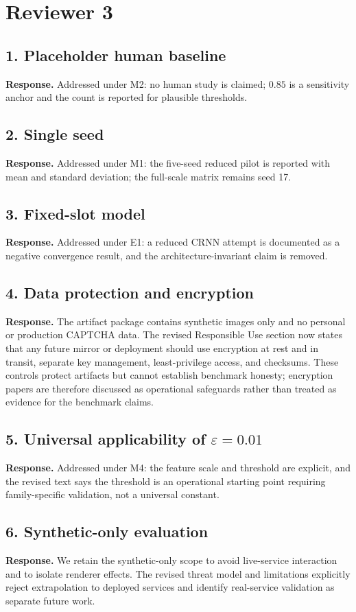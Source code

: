 \documentclass[11pt]{article}
\newcommand{\response}[1]{\par\noindent\textbf{Response.} #1\par}
\begin{document}
\section*{Reviewer 3}
\subsection*{1. Placeholder human baseline}
\response{Addressed under M2: no human study is claimed; $0.85$ is a sensitivity anchor and the count is reported for plausible thresholds.}
\subsection*{2. Single seed}
\response{Addressed under M1: the five-seed reduced pilot is reported with mean and standard deviation; the full-scale matrix remains seed 17.}
\subsection*{3. Fixed-slot model}
\response{Addressed under E1: a reduced CRNN attempt is documented as a negative convergence result, and the architecture-invariant claim is removed.}
\subsection*{4. Data protection and encryption}
\response{The artifact package contains synthetic images only and no personal or production CAPTCHA data. The revised Responsible Use section now states that any future mirror or deployment should use encryption at rest and in transit, separate key management, least-privilege access, and checksums. These controls protect artifacts but cannot establish benchmark honesty; encryption papers are therefore discussed as operational safeguards rather than treated as evidence for the benchmark claims.}
\subsection*{5. Universal applicability of $\varepsilon=0.01$}
\response{Addressed under M4: the feature scale and threshold are explicit, and the revised text says the threshold is an operational starting point requiring family-specific validation, not a universal constant.}
\subsection*{6. Synthetic-only evaluation}
\response{We retain the synthetic-only scope to avoid live-service interaction and to isolate renderer effects. The revised threat model and limitations explicitly reject extrapolation to deployed services and identify real-service validation as separate future work.}
\end{document}
